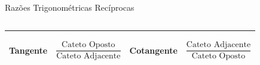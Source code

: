 \documentclass[aspectratio=169, t, 8pt]{beamer}
\begin{document}
\begin{frame}{Razões Trigonométricas Recíprocas}
\begin{columns}[c, totalwidth=.8\textwidth]
\begin{column}{\textwidth}
\begin{tabular}{m{} | m{} | m{} | m{}}
                    {
                        \begin{center}
                            \textbf{Tangente}
                        \end{center}
                    } &
                    {
                        \begin{center}
                            $$
                            \frac{
                                \text{Cateto Oposto}
                            }{
                                \text{Cateto Adjacente}
                            }
                            $$
                        \end{center}
                    } &

                    {
                        \begin{center}
                            \textbf{Cotangente}
                        \end{center}
                    } &
                    {
                        \begin{center}
                            $$
                            \frac{
                                \text{Cateto Adjacente}
                            }{
                                \text{Cateto Oposto}
                            }
                            $$
                        \end{center}
                    }\\
                    \hline
                    \end{tabular}    
            \end{column}
        \end{columns}
    \end{frame}

\end{document}
